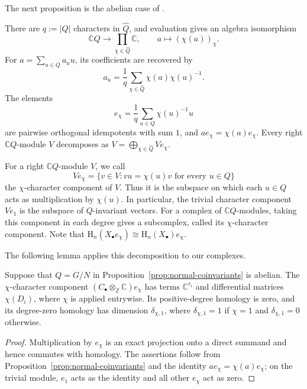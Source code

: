 \documentclass[11pt,a4paper]{amsart}
\numberwithin{equation}{section}
\newcommand{\HH}{\mathrm H}
\begin{document}
The next proposition is the abelian case of
\cite[Theorem~3.3.1 and Corollaries~3.3.2--3.3.3,
pp.~262--263]{Lin}.
\begin{proposition}\label{prop:fourier}
There are $q:=|Q|$ characters in $\widehat Q$, and evaluation gives
an algebra isomorphism
\[
 \mathbb C Q \longrightarrow\prod_{\chi\in\widehat Q}\mathbb C,
 \qquad a\longmapsto(\chi(a))_\chi.
\]
For $a=\sum_{u\in Q}a_u u$, its coefficients are recovered by
\begin{equation}\label{eq:arithmetic-fourier}
 a_u=\frac1q\sum_{\chi\in\widehat Q}\chi(a)\chi(u)^{-1}.
\end{equation}
The elements
\[
 e_\chi=\frac1q\sum_{u\in Q}\chi(u)^{-1}u
\]
are pairwise orthogonal idempotents with sum $1$, and
$ae_\chi=\chi(a)e_\chi$. Every right $\mathbb C Q $-module
$V$ decomposes as $V=\bigoplus_{\chi\in\widehat Q}Ve_\chi$.
\end{proposition}
For a right $\mathbb{C} Q$-module $V$, we call
\[
Ve_\chi
=
\{v \in V : vu = \chi(u)v \text{ for every } u \in Q\}
\]
the $\chi$-character component of $V$. Thus it is the
subspace on which each $u \in Q$ acts as multiplication by
$\chi(u)$. In particular, the trivial character component
$Ve_1$ is the subspace of $Q$-invariant vectors. For a complex
of $\mathbb{C} Q$-modules, taking this component in each
degree gives a subcomplex, called its
$\chi$-character component. Note that $\HH_n(X_\bullet e_\chi)\cong \HH_n(X_\bullet)e_\chi$.

The following lemma applies this decomposition to our complexes.

\begin{lemma}\label{lem:character-complex}
Suppose that $Q=G/N$ in Proposition~\ref{prop:normal-coinvariants}
is abelian. The $\chi$-character component
$(C_\bullet \otimes_{\mathbb{Z}} \mathbb{C})e_\chi$
has terms $\mathbb{C}^{r_i}$ and differential matrices
$\chi(D_i)$, where $\chi$ is applied entrywise. Its positive-degree
homology is zero, and its degree-zero homology has dimension
$\delta_{\chi,1}$, where $\delta_{\chi,1}=1$ if $\chi=1$
and $\delta_{\chi,1}=0$ otherwise.
\end{lemma}

\begin{proof}
Multiplication by $e_\chi$ is an exact projection onto a direct
summand and hence commutes with homology. The assertions follow
from Proposition~\ref{prop:normal-coinvariants} and the identity
$ae_\chi=\chi(a)e_\chi$; on the trivial module, $e_1$ acts
as the identity and all other $e_\chi$ act as zero.
\end{proof}
\end{document}

